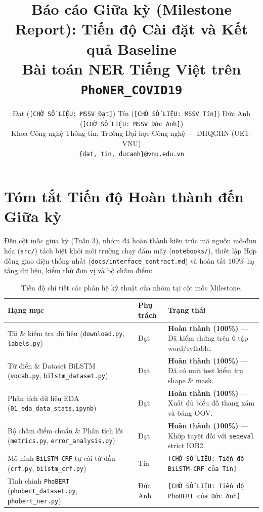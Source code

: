 \documentclass[11pt,a4paper,twocolumn]{article}
\title{Báo cáo Giữa kỳ (Milestone Report): Tiến độ Cài đặt và Kết quả Baseline\\
Bài toán NER Tiếng Việt trên \texttt{PhoNER\_COVID19}}
\author{
  Đạt (\texttt{[CHỜ SỐ LIỆU: MSSV Đạt]}) \quad
  Tín (\texttt{[CHỜ SỐ LIỆU: MSSV Tín]}) \quad
  Đức Anh (\texttt{[CHỜ SỐ LIỆU: MSSV Đức Anh]}) \\
  Khoa Công nghệ Thông tin, Trường Đại học Công nghệ — ĐHQGHN (UET-VNU) \\
  \texttt{\{dat, tin, ducanh\}@vnu.edu.vn}
}
\date{}
\begin{document}
\maketitle

\section{Tóm tắt Tiến độ Hoàn thành đến Giữa kỳ}
Đến cột mốc giữa kỳ (Tuần 3), nhóm đã hoàn thành kiến trúc mã nguồn mô-đun hóa (\texttt{src/}) tách biệt khỏi môi trường chạy đám mây (\texttt{notebooks/}), thiết lập Hợp đồng giao diện thống nhất (\texttt{docs/interface\_contract.md}) và hoàn tất $100\%$ hạ tầng dữ liệu, kiểm thử đơn vị và bộ chấm điểm:

\begin{table}[h]
\centering
\small
\begin{tabular}{p{2.6cm}p{1.2cm}p{3.1cm}}
\hline
\textbf{Hạng mục} & \textbf{Phụ trách} & \textbf{Trạng thái} \\
\hline
Tải \& kiểm tra dữ liệu (\texttt{download.py}, \texttt{labels.py}) & Đạt & \textbf{Hoàn thành (100\%)} — Đã kiểm chứng trên $6$ tập word/syllable. \\
\hline
Từ điển \& Dataset BiLSTM (\texttt{vocab.py}, \texttt{bilstm\_dataset.py}) & Đạt & \textbf{Hoàn thành (100\%)} — Đã có unit test kiểm tra shape \& mask. \\
\hline
Phân tích dữ liệu EDA (\texttt{01\_eda\_data\_stats.ipynb}) & Đạt & \textbf{Hoàn thành (100\%)} — Xuất đủ biểu đồ thang xám và bảng OOV. \\
\hline
Bộ chấm điểm chuẩn \& Phân tích lỗi (\texttt{metrics.py}, \texttt{error\_analysis.py}) & Đạt & \textbf{Hoàn thành (100\%)} — Khớp tuyệt đối với \texttt{seqeval} strict IOB2. \\
\hline
Mô hình \texttt{BiLSTM-CRF} tự cài từ đầu (\texttt{crf.py}, \texttt{bilstm\_crf.py}) & Tín & \texttt{[CHỜ SỐ LIỆU: Tiến độ BiLSTM-CRF của Tín]} \\
\hline
Tinh chỉnh \texttt{PhoBERT} (\texttt{phobert\_dataset.py}, \texttt{phobert\_ner.py}) & Đức Anh & \texttt{[CHỜ SỐ LIỆU: Tiến độ PhoBERT của Đức Anh]} \\
\hline
\end{tabular}
\caption{Tiến độ chi tiết các phân hệ kỹ thuật của nhóm tại cột mốc Milestone.}
\label{tab:ms_progress}
\end{table}

\end{document}
